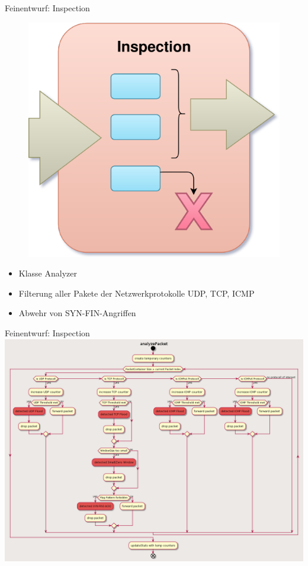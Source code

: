 \documentclass{beamer}
\begin{document}
\begin{frame}{Feinentwurf: Inspection}
    \begin{minipage}[h]{0.45\textwidth}
        \begin{figure}[h!]
            \includegraphics[width=\textwidth, center]{inspection.pdf}
        \end{figure}
    \end{minipage}
    \hfill
    \begin{minipage}[h]{0.45\textwidth}
        \begin{itemize}
            \item Klasse Analyzer
            \item Filterung aller Pakete der Netzwerkprotokolle UDP, TCP, ICMP
            \item Abwehr von SYN-FIN-Angriffen
        \end{itemize}
    \end{minipage}
\end{frame}

\begin{frame}{Feinentwurf: Inspection}
    \includegraphics[width=\textwidth, center]{analyzerDiagram.png}
\end{frame}
\end{document}
